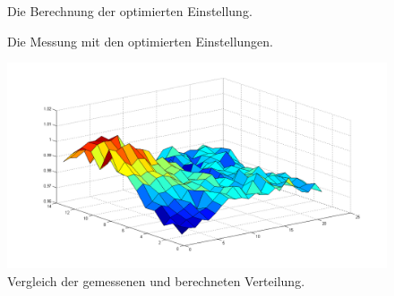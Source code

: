 \documentclass[a4paper,bibtotoc,oneside]{scrbook}
\begin{document}
\begin{figure} [htbp]
\caption{Die Berechnung der optimierten Einstellung.}
\label{optb}
\end{figure} 

\begin{figure} [htbp]
\caption{Die Messung mit den optimierten Einstellungen.}
\label{optm}
\end{figure} 

\begin{figure}[htbp]
\centering
\includegraphics[width=125mm]{img/vergleich_opt.png}
\caption{Vergleich der gemessenen und berechneten Verteilung.}\label{v26}
\end{figure}
\end{document}
